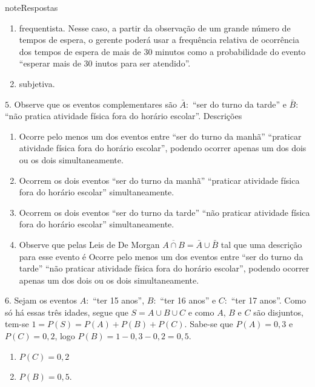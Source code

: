 \begin{sphinxadmonition}{note}{Respostas}
\begin{enumerate}
\item {} 
frequentista. Nesse caso, a partir da observação de um grande número de tempos de espera, o gerente poderá usar a frequência relativa de ocorrência dos tempos de espera de mais de 30 minutos como a probabilidade do evento “esperar mais de 30 inutos para ser atendido”.

\item {} 
subjetiva.

\end{enumerate}

\(5.\)  Observe que os eventos complementares são \(\bar{A}:\) “ser do turno da tarde” e \(\bar{B}:\) “não pratica atividade física fora do horário escolar”. Descrições
\begin{enumerate}
\item {} 
Ocorre pelo menos um dos eventos entre “ser do turno da manhã”  “praticar atividade física fora do horário escolar”, podendo ocorrer apenas um dos dois ou os dois simultaneamente.

\item {} 
Ocorrem os dois eventos “ser do turno da manhã”  “praticar atividade física fora do horário escolar” simultaneamente.

\item {} 
Ocorrem os dois eventos “ser do turno da tarde”  “não praticar atividade física fora do horário escolar” simultaneamente.

\item {} 
Observe que pelas Leis de De Morgan \(\overline{A\cap B}=\bar{A}\cup \bar{B}\) tal que uma descrição para esse evento é Ocorre pelo menos um dos eventos entre “ser do turno da tarde”  “não praticar atividade física fora do horário escolar”, podendo ocorrer apenas um dos dois ou os dois simultaneamente.

\end{enumerate}

\(6.\) Sejam os eventos \(A:\) “ter 15 anos”, \(B:\) “ter 16 anos” e \(C:\) “ter 17 anos”. Como só há essas três idades, segue que \(S=A\cup B\cup C\) e como \(A\), \(B\) e \(C\)  são disjuntos, tem-se
\(1=P(S)=P(A)+P(B)+P(C)\). Sabe-se que \(P(A)=0,3\) e \(P(C)=0,2\), logo \(P(B)=1-0,3-0,2=0,5\).
\begin{enumerate}
\item {} 
\(P(C)=0,2\)

\item {} 
\(P(B)=0,5\).


\end{enumerate}
\end{sphinxadmonition}
